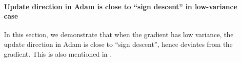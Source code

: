 \documentclass{article}
\begin{document}
\paragraph{Update direction in Adam is close to ``sign descent'' in low-variance case}
\label{subsec:direction}
In this section, we demonstrate that when the gradient has low variance, the update direction in Adam is close to ``sign descent'', hence deviates from the gradient. This is also mentioned in \cite{balles2017dissecting}. 
\end{document}
